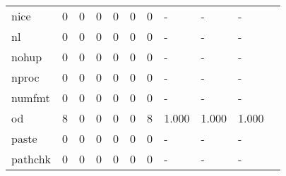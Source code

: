 \begin{longtable}{lp{1.10cm}p{1.10cm}p{1.10cm}p{1.10cm}p{1.10cm}p{1.10cm}p{1.10cm}p{1.10cm}p{1.10cm}p{1.10cm}}
nice      &                      0 &                                  0 &                                 0 &                                0 &                                 0 &                               0 &                              - &                                     - &                                   - \\
nl        &                      0 &                                  0 &                                 0 &                                0 &                                 0 &                               0 &                              - &                                     - &                                   - \\
nohup     &                      0 &                                  0 &                                 0 &                                0 &                                 0 &                               0 &                              - &                                     - &                                   - \\
nproc     &                      0 &                                  0 &                                 0 &                                0 &                                 0 &                               0 &                              - &                                     - &                                   - \\
numfmt    &                      0 &                                  0 &                                 0 &                                0 &                                 0 &                               0 &                              - &                                     - &                                   - \\
od        &                      8 &                                  0 &                                 0 &                                0 &                                 0 &                               8 &                          1.000 &                                 1.000 &                               1.000 \\
paste     &                      0 &                                  0 &                                 0 &                                0 &                                 0 &                               0 &                              - &                                     - &                                   - \\
pathchk   &                      0 &                                  0 &                                 0 &                                0 &                                 0 &                               0 &                              - &                                     - &                                   - \\

\end{longtable}
